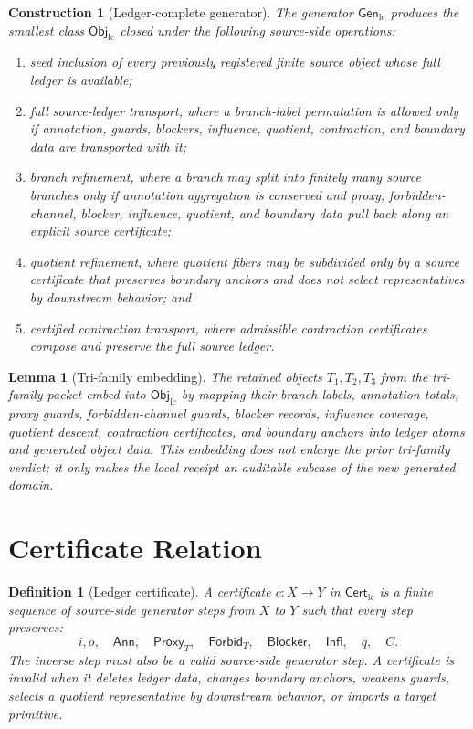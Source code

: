 \documentclass[11pt]{article}
\newcommand{\ObjLC}{\mathsf{Obj}_{\mathrm{lc}}}
\newcommand{\GenLC}{\mathsf{Gen}_{\mathrm{lc}}}
\newcommand{\CertLC}{\mathsf{Cert}_{\mathrm{lc}}}
\newcommand{\Ann}{\mathsf{Ann}}
\newcommand{\Proxy}{\mathsf{Proxy}_{T}}
\newcommand{\Forbid}{\mathsf{Forbid}_{T}}
\newcommand{\Blocker}{\mathsf{Blocker}}
\newcommand{\Infl}{\mathsf{Infl}}
\newtheorem{definition}{Definition}
\newtheorem{construction}{Construction}
\newtheorem{lemma}{Lemma}
\begin{document}
\begin{construction}[Ledger-complete generator]
The generator \(\GenLC\) produces the smallest class \(\ObjLC\) closed
under the following source-side operations:
\begin{enumerate}
    \item seed inclusion of every previously registered finite source
    object whose full ledger is available;
    \item full source-ledger transport, where a branch-label
    permutation is allowed only if annotation, guards, blockers,
    influence, quotient, contraction, and boundary data are transported
    with it;
    \item branch refinement, where a branch may split into finitely many
    source branches only if annotation aggregation is conserved and
    proxy, forbidden-channel, blocker, influence, quotient, and boundary
    data pull back along an explicit source certificate;
    \item quotient refinement, where quotient fibers may be subdivided
    only by a source certificate that preserves boundary anchors and
    does not select representatives by downstream behavior; and
    \item certified contraction transport, where admissible contraction
    certificates compose and preserve the full source ledger.
\end{enumerate}
\end{construction}

\begin{lemma}[Tri-family embedding]
The retained objects \(T_{1},T_{2},T_{3}\) from the tri-family packet
embed into \(\ObjLC\) by mapping their branch labels, annotation totals,
proxy guards, forbidden-channel guards, blocker records, influence
coverage, quotient descent, contraction certificates, and boundary
anchors into ledger atoms and generated object data. This embedding
does not enlarge the prior tri-family verdict; it only makes the local
receipt an auditable subcase of the new generated domain.
\end{lemma}

\section{Certificate Relation}

\begin{definition}[Ledger certificate]
A certificate \(c:X\to Y\) in \(\CertLC\) is a finite sequence of
source-side generator steps from \(X\) to \(Y\) such that every step
preserves:
\[
    i,o,\quad \Ann,\quad \Proxy,\quad \Forbid,\quad
    \Blocker,\quad \Infl,\quad q,\quad C.
\]
The inverse step must also be a valid source-side generator step. A
certificate is invalid when it deletes ledger data, changes boundary
anchors, weakens guards, selects a quotient representative by downstream
behavior, or imports a target primitive.
\end{definition}
\end{document}
